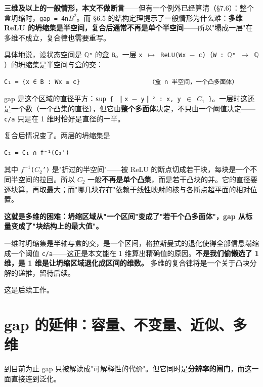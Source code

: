 \documentclass[11pt,a4paper]{ctexart}
\begin{document}
\textbf{三维及以上的一般情形，本文不做断言}——但有一个例外已经算清（§7.6）：整个盒坍缩时，\texttt{gap = 4n\ensuremath{B^{2}}}。而 §6.5 的结构定理提示了一般情形为什么难：\textbf{多维 ReLU 的坍缩集是半空间，复合后通常不再是单个半空间}——所以"塌成一层"在多维不成立，复合律也需要重写。

具体地说，设状态空间是 \texttt{\ensuremath{\mathbb{Q}}ⁿ} 的盒 \texttt{B}。一层 \texttt{x \ensuremath{\mapsto} ReLU(Wx \ensuremath{-} c)}（\texttt{W : \ensuremath{\mathbb{Q}}ⁿ \ensuremath{\to} \ensuremath{\mathbb{Q}}}）的坍缩集是半空间与盒的交：

\begin{lstlisting}
C₁ = {x ∈ B : Wx ≤ c}                   （盒 ∩ 半空间，一个凸多面体）
\end{lstlisting}

gap 是这个区域的直径平方：\texttt{sup \{ \ensuremath{\|}x \ensuremath{-} y\ensuremath{\|}² : x, y \ensuremath{\in} \ensuremath{C_{1}} \}}。一层时这还是一个数（一个凸集的直径），但它由\textbf{整个多面体}决定，不只由一个阈值决定——\texttt{c/a} 只是在 1 维时恰好是直径的一半。

复合后情况变了。两层的坍缩集是

\begin{lstlisting}
C₂ = C₁ ∩ f⁻¹(C₂')
\end{lstlisting}

其中 \texttt{\ensuremath{f^{-1}}(\ensuremath{C_{2}}')} 是"折过的半空间"——被 ReLU 的断点切成若干块，每块是一个不同半空间的拉回。所以 \texttt{\ensuremath{C_{2}}} 一般\textbf{不再是单个凸集}，而是若干凸块的并。它的直径要逐块算，再取最大；而"哪几块存在"依赖于线性映射的核与各断点超平面的相对位置。

\textbf{这就是多维的困难：坍缩区域从"一个区间"变成了"若干个凸多面体"，gap 从标量变成了"块结构上的最大值"。}

一维时坍缩集是半轴与盒的交，是一个区间，格拉斯曼式的退化使得全部信息塌缩成一个阈值 \texttt{c/a}——这正是本文能在 1 维算出精确值的原因。\textbf{不是我们偷懒选了 1 维，是 1 维是让坍缩区域退化成区间的维数。} 多维的复合律将是一个关于凸块分解的递推，留待后续。

这是后续工作。

\section{gap 的延伸：容量、不变量、近似、多维}

到目前为止 gap 只被解读成"可解释性的代价"。但它同时是\textbf{分辨率的闸门}，而这一面直接连到泛化。
\end{document}
